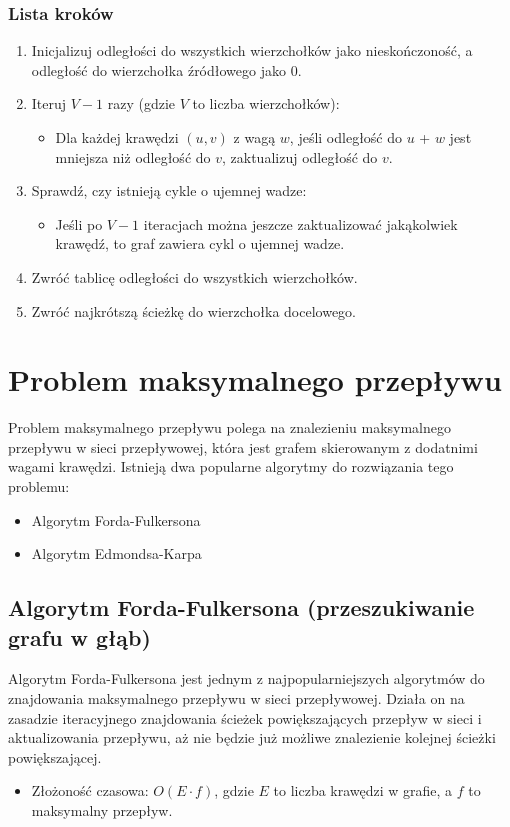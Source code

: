 \documentclass{article}
\begin{document}
\subsubsection{Lista kroków}
\begin{enumerate}
    \item Inicjalizuj odległości do wszystkich wierzchołków jako nieskończoność, a odległość do wierzchołka źródłowego jako 0.
    \item Iteruj $V-1$ razy (gdzie $V$ to liczba wierzchołków):
    \begin{itemize}
        \item Dla każdej krawędzi $(u, v)$ z wagą $w$, jeśli odległość do $u$ + $w$ jest mniejsza niż odległość do $v$, zaktualizuj odległość do $v$.
    \end{itemize}
    \item Sprawdź, czy istnieją cykle o ujemnej wadze:
    \begin{itemize}
        \item Jeśli po $V-1$ iteracjach można jeszcze zaktualizować jakąkolwiek krawędź, to graf zawiera cykl o ujemnej wadze.
    \end{itemize}
    \item Zwróć tablicę odległości do wszystkich wierzchołków.
    \item Zwróć najkrótszą ścieżkę do wierzchołka docelowego.
\end{enumerate}

\section{Problem maksymalnego przepływu}

Problem maksymalnego przepływu polega na znalezieniu maksymalnego przepływu w sieci przepływowej, która jest grafem skierowanym z dodatnimi wagami krawędzi.
Istnieją dwa popularne algorytmy do rozwiązania tego problemu:

\begin{itemize}
    \item Algorytm Forda-Fulkersona
    \item Algorytm Edmondsa-Karpa
\end{itemize}

\subsection{Algorytm Forda-Fulkersona (przeszukiwanie grafu w głąb)}

Algorytm Forda-Fulkersona jest jednym z najpopularniejszych algorytmów do znajdowania maksymalnego przepływu w sieci przepływowej.
Działa on na zasadzie iteracyjnego znajdowania ścieżek powiększających przepływ w sieci i aktualizowania przepływu, aż nie będzie już możliwe znalezienie kolejnej ścieżki powiększającej.
\begin{itemize}
    \item Złożoność czasowa: $O(E \cdot f)$, gdzie $E$ to liczba krawędzi w grafie, a $f$ to maksymalny przepływ.
\end{itemize}
\end{document}
